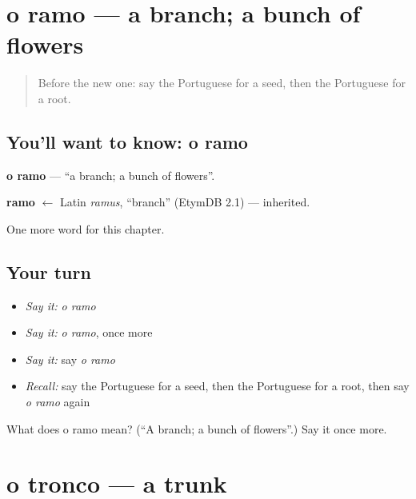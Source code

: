 \section[o ramo]{o ramo — a branch; a bunch of flowers}

\label{lesson:PT-C250-ramo}



\begin{quote}
Before the new one: say the Portuguese for a seed, then the Portuguese for a root.
\end{quote}

\subsection*{You'll want to know: o ramo}
\textbf{o ramo} — \textquotedblleft{}a branch; a bunch of flowers\textquotedblright{}.

\begin{cousinweb}
\textbf{ramo} $\leftarrow$ Latin \emph{ramus}, \textquotedblleft{}branch\textquotedblright{} (EtymDB 2.1) — inherited.
\end{cousinweb}

\begin{grammarlens}[title={What you've built}]
One more word for this chapter.
\end{grammarlens}

\subsection*{Your turn}
\begin{itemize}
\raggedright
  \item \emph{Say it:} \emph{o ramo}
  \item \emph{Say it:} \emph{o ramo}, once more
  \item \emph{Say it:} say \emph{o ramo}
  \item \emph{Recall:} say the Portuguese for a seed, then the Portuguese for a root, then say \emph{o ramo} again
\end{itemize}

\begin{tcolorbox}[breakable,colback=teal!4,colframe=teal!35!black,title={Before you move on}]
What does o ramo mean? (\textquotedblleft{}A branch; a bunch of flowers\textquotedblright{}.) Say it once more.
\end{tcolorbox}
\section[o tronco]{o tronco — a trunk}

